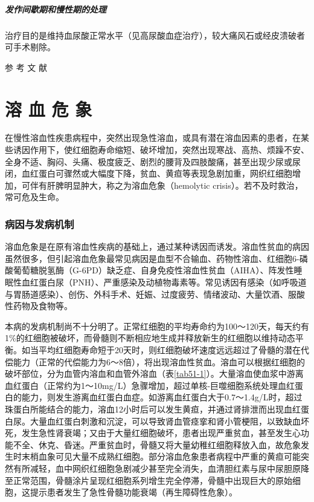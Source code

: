 \paragraph{发作间歇期和慢性期的处理}

治疗目的是维持血尿酸正常水平（见高尿酸血症治疗），较大痛风石或经皮溃破者可手术剔除。
\protect\hypertarget{text00126.html}{}{}

\hypertarget{text00126.htmlux5cux23CHP4-15-4}{}
参 考 文 献

\chapter{溶 血 危 象}

在慢性溶血性疾患病程中，突然出现急性溶血，或具有潜在溶血因素的患者，在某些诱因作用下，使红细胞寿命缩短、破坏增加，突然出现寒战、高热、烦躁不安、全身不适、胸闷、头痛、极度疲乏、剧烈的腰背及四肢酸痛，甚至出现少尿或尿闭，血红蛋白可骤然或大幅度下降，贫血、黄疸等表现急剧加重，网织红细胞增加，可伴有肝脾明显肿大，称之为溶血危象（hemolytic
crisis）。若不及时救治，常可危及生命。

\subsection{病因与发病机制}

溶血危象是在原有溶血性疾病的基础上，通过某种诱因而诱发。溶血性贫血的病因虽然很多，但引起溶血危象最常见病因是血型不合输血、药物性溶血、红细胞6-磷酸葡萄糖脱氢酶（G-6PD）缺乏症、自身免疫性溶血性贫血（AIHA）、阵发性睡眠性血红蛋白尿（PNH）、严重感染及动植物毒素等。常见诱因有感染（如呼吸道与胃肠道感染）、创伤、外科手术、妊娠、过度疲劳、情绪波动、大量饮酒、服酸性药物及食物等。

本病的发病机制尚不十分明了。正常红细胞的平均寿命约为100～120天，每天约有1\%的红细胞被破坏，而骨髓则不断相应地生成并释放新生的红细胞以维持动态平衡。如当平均红细胞寿命短于20天时，则红细胞破坏速度远远超过了骨髓的潜在代偿能力（正常的代偿能力为6～8倍），将出现溶血性贫血。溶血可以根据红细胞的破坏部位，分为血管内溶血和血管外溶血（表\ref{tab51-1}）。大量溶血使血浆中游离血红蛋白（正常约为1～10mg/L）急骤增加，超过单核-巨噬细胞系统处理血红蛋白的能力，则发生游离血红蛋白血症。如游离血红蛋白大于0.7～1.4g/L时，超过珠蛋白所能结合的能力，溶血12小时后可以发生黄疸，并通过肾排泄而出现血红蛋白尿。大量血红蛋白刺激和沉淀，可以导致肾血管痉挛和肾小管梗阻，以致缺血坏死，发生急性肾衰竭；又由于大量红细胞破坏，患者出现严重贫血，甚至发生心功能不全、休克、昏迷。严重贫血时，骨髓又将大量幼稚红细胞释放入血，故危象发生时末梢血象可见大量不成熟红细胞。部分溶血危象患者病程中严重的黄疸可能突然有所减轻，血中网织红细胞急剧减少甚至完全消失，血清胆红素与尿中尿胆原降至正常范围，骨髓涂片呈现红细胞系列增生完全停滞，骨髓中出现巨大的原始细胞，这提示患者发生了急性骨髓功能衰竭（再生障碍性危象）。

